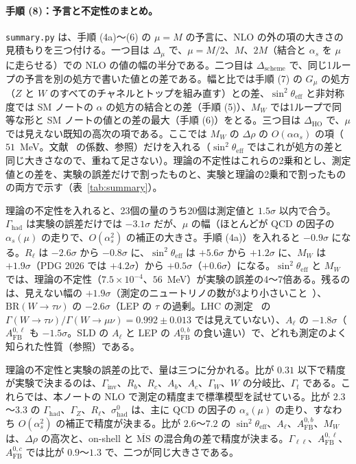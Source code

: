 \documentclass[a4paper,10pt]{ltjsarticle}
\newcommand{\MSbar}{\overline{\mathrm{MS}}}
\begin{document}
\FloatBarrier
\paragraph{手順 (8)：予言と不定性のまとめ。}\texttt{summary.py} は、手順 (4a)〜(6) の $\mu=M$ の予言に、NLO の外の項の大きさの見積もりを三つ付ける。一つ目は $\Delta_\mu$ で、$\mu=M/2$、$M$、$2M$（結合と $\alpha_s$ を $\mu$ に走らせる）での NLO の値の幅の半分である。二つ目は $\Delta_{\mathrm{scheme}}$ で、同じ1ループの予言を別の処方で書いた値との差である。幅と比では手順 (7) の $G_\mu$ の処方（$Z$ と $W$ のすべてのチャネルとトップを組み直す）との差、$\sin^2\theta_{\mathrm{eff}}$ と非対称度では SM ノートの $\alpha$ の処方の結合との差（手順 (5)）、$M_W$ では1ループで同等な形と SM ノートの値との差の最大（手順 (6)）をとる。三つ目は $\Delta_{\mathrm{HO}}$ で、$\mu$ では見えない既知の高次の項である。ここでは $M_W$ の $\Delta\rho$ の $O(\alpha\alpha_s)$ の項（$51$~MeV。文献~\cite{dv87} の係数、参照）だけを入れる（$\sin^2\theta_{\mathrm{eff}}$ ではこれが処方の差と同じ大きさなので、重ねて足さない）。理論の不定性はこれらの2乗和とし、測定値との差を、実験の誤差だけで割ったものと、実験と理論の2乗和で割ったものの両方で示す（表~\ref{tab:summary}）。

理論の不定性を入れると、23個の量のうち20個は測定値と $1.5\sigma$ 以内で合う。$\Gamma_{\mathrm{had}}$ は実験の誤差だけでは $-3.1\sigma$ だが、$\mu$ の幅（ほとんどが QCD の因子の $\alpha_s(\mu)$ の走りで、$O(\alpha_s^2)$ の補正の大きさ。手順 (4a)）を入れると $-0.9\sigma$ になる。$R_\ell$ は $-2.6\sigma$ から $-0.8\sigma$ に、$\sin^2\theta_{\mathrm{eff}}$ は $+5.6\sigma$ から $+1.2\sigma$ に、$M_W$ は $+1.9\sigma$（PDG 2026 では $+4.2\sigma$）から $+0.5\sigma$（$+0.6\sigma$）になる。$\sin^2\theta_{\mathrm{eff}}$ と $M_W$ では、理論の不定性（$7.5\times10^{-4}$、$56$~MeV）が実験の誤差の4〜7倍ある。残るのは、見えない幅の $+1.9\sigma$（測定のニュートリノの数が3より小さいこと~\cite{lepewwg06}）、$\mathrm{BR}(W\to\tau\nu)$ の $-2.6\sigma$（LEP の $\tau$ の過剰。LHC の測定~\cite{atlas21} の $\Gamma(W\to\tau\nu)/\Gamma(W\to\mu\nu)=0.992\pm0.013$ では見えていない）、$A_\ell$ の $-1.8\sigma$（$A^{0,\ell}_{\mathrm{FB}}$ も $-1.5\sigma$。SLD の $A_\ell$ と LEP の $A^{0,b}_{\mathrm{FB}}$ の食い違い）で、どれも測定のよく知られた性質（参照）である。

理論の不定性と実験の誤差の比で、量は三つに分かれる。比が $0.31$ 以下で精度が実験で決まるのは、$\Gamma_{\mathrm{inv}}$、$R_b$、$R_c$、$A_b$、$A_c$、$\Gamma_W$、$W$ の分岐比、$\Gamma_t$ である。これらでは、本ノートの NLO で測定の精度まで標準模型を試せている。比が $2.3$〜$3.3$ の $\Gamma_{\mathrm{had}}$、$\Gamma_Z$、$R_\ell$、$\sigma^0_{\mathrm{had}}$ は、主に QCD の因子の $\alpha_s(\mu)$ の走り、すなわち $O(\alpha_s^2)$ の補正で精度が決まる。比が $2.6$〜$7.2$ の $\sin^2\theta_{\mathrm{eff}}$、$A_\ell$、$A^{0,b}_{\mathrm{FB}}$、$M_W$ は、$\Delta\rho$ の高次と、on-shell と $\MSbar$ の混合角の差で精度が決まる。$\Gamma_{\ell\ell}$、$A^{0,\ell}_{\mathrm{FB}}$、$A^{0,c}_{\mathrm{FB}}$ では比が $0.9$〜$1.3$ で、二つが同じ大きさである。
\end{document}
